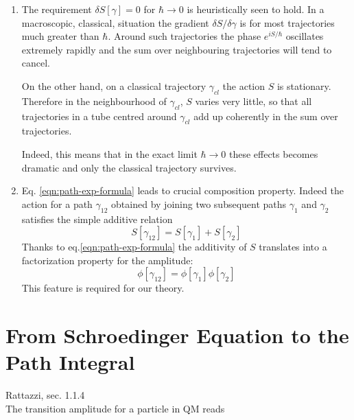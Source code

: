 \documentclass[../main/main.tex]{subfiles}
\begin{document}
\begin{enumerate}
\item The requirement $\delta S[\gamma]=0$ for $\hbar\to0$ is heuristically seen to hold. In a macroscopic, classical, situation the gradient $\delta S/\delta\gamma$ is for most trajectories much greater than $\hbar$. Around such trajectories the phase $e^{iS/\hbar}$ oscillates extremely rapidly and the sum over neighbouring trajectories will tend to cancel. 

On the other hand, on a classical trajectory $\gamma_{cl}$ the action $S$ is stationary. Therefore in the neighbourhood of $\gamma_{cl}$, $S$ varies very little, so that all trajectories in a tube centred around $\gamma_{cl}$ add up coherently in the sum over trajectories. 

Indeed, this means that in the exact limit $\hbar\to0$ these effects becomes dramatic and only the classical trajectory survives.

\item Eq. \eqref{eqn:path-exp-formula} leads to crucial composition property. Indeed the action for a path $\gamma_{12}$ obtained by joining two subsequent paths $\gamma_1$ and $\gamma_2$ satisfies the simple additive relation
\[S[\gamma_{12}]=S[\gamma_1]+S[\gamma_2]\]
Thanks to eq.\eqref{eqn:path-exp-formula} the additivity of $S$ translates into a factorization property for the amplitude:
\[\phi[\gamma_{12}]=\phi[\gamma_1]\phi[\gamma_2]\]
This feature is required for our theory.

\end{enumerate}


\section{From Schroedinger Equation to the Path Integral}
\textsf{Rattazzi, sec. 1.1.4}\\

The transition amplitude for a particle in QM reads
\end{document}
